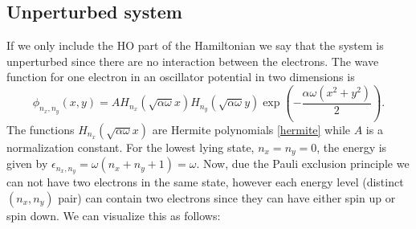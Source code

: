 \documentclass[english, a4paper]{article}
\begin{document}
\subsection{Unperturbed system}
If we only include the HO part of the Hamiltonian we say that the system is unperturbed since 
there are no interaction between the electrons. The wave function for one 
electron in an oscillator potential in two dimensions is
\begin{equation}
 \phi_{n_x,n_y}(x,y) = AH_{n_x}(\sqrt{\alpha\omega}x)H_{n_y}
 (\sqrt{\alpha\omega}y)\exp\left(-\frac{\alpha\omega(x^2+y^2)}{2}\right).
 \label{singleParticleWF}
\end{equation}
The functions $H_{n_x}(\sqrt{\alpha\omega}x)$ are Hermite polynomials \eqref{hermite}
while $A$ is a normalization constant. 
For the lowest lying state, $n_x = n_y = 0$, the energy is given by
$\epsilon_{n_x,n_y} = \omega(n_x+n_y+1) = \omega$. Now, due the Pauli exclusion principle we can not 
have two electrons in the same state, however each energy level (distinct $(n_x,n_y)$ pair)
can contain two electrons since they can have either spin up or spin down. We can visualize this as follows:
\end{document}
